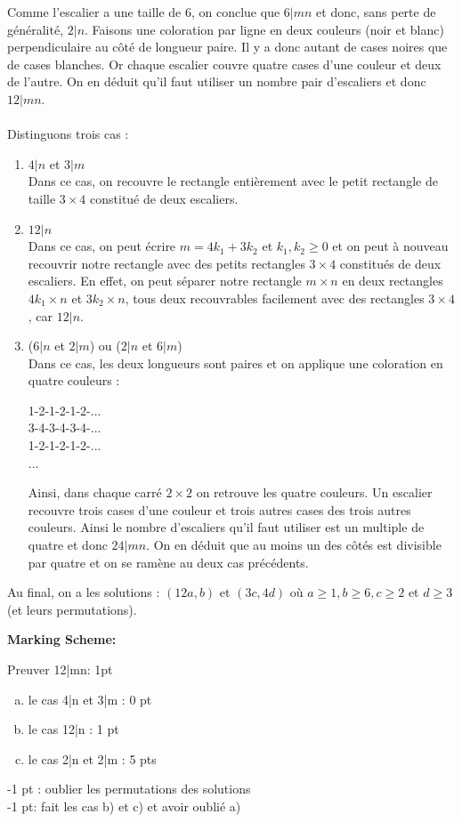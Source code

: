 \documentclass[language=german,style=solution]{smo}
\begin{document}
\begin{enumerate}
Comme l'escalier a une taille de $6$, on conclue que $6|mn$ et donc, sans perte de généralité, $2|n$. Faisons une coloration par ligne en deux couleurs (noir et blanc) perpendiculaire au côté de longueur paire. Il y a donc autant de cases noires que de cases blanches. Or chaque escalier couvre quatre cases d'une couleur et deux de l'autre. On en déduit qu'il faut utiliser un nombre pair d'escaliers et donc $12|mn$.\\
\\Distinguons trois cas :
\begin{enumerate}
\item $4|n$ et $3|m$\\
Dans ce cas, on recouvre le rectangle entièrement avec le petit rectangle de taille $3\times 4$ constitué de deux escaliers.
\item $12|n$\\
Dans ce cas, on peut écrire $m=4k_1 +3k_2$ et $k_1,k_2\geq 0$ et on peut à nouveau recouvrir notre rectangle avec des petits rectangles $3\times 4$ constitués de deux escaliers. En effet, on peut séparer notre rectangle $m\times n$ en deux rectangles $4k_1\times n$ et $3k_2\times n$, tous deux recouvrables facilement avec des rectangles $3\times 4$, car $12|n$.
\item ($6|n$ et $2|m$) ou ($2|n$ et $6|m$)\\
Dans ce cas, les deux longueurs sont paires et on applique une coloration en quatre couleurs :
\begin{center}
1-2-1-2-1-2-...\\
3-4-3-4-3-4-...\\
1-2-1-2-1-2-...\\
...
\end{center}
Ainsi, dans chaque carré $2\times 2$ on retrouve les quatre couleurs. Un escalier recouvre trois cases d'une couleur et trois autres cases des trois autres couleurs. Ainsi le nombre d'escaliers qu'il faut utiliser est un multiple de quatre et donc $24|mn$. On en déduit que au moins un des côtés est divisible par quatre et on se ramène au deux cas précédents.
\end{enumerate}
Au final, on a les solutions : $(12a,b)$ et $(3c,4d)$ où $a\geq 1, b\geq 6, c\geq 2$ et $d\geq 3$ (et leurs permutations). 

\textbf{Marking Scheme:}

Preuver 12|mn: 1pt
\begin{enumerate}[a)]
\item le cas 4|n et 3|m : 0 pt
\item le cas 12|n : 1 pt
\item le cas 2|n et 2|m : 5 pts
\end{enumerate}

-1 pt : oublier les permutations des solutions\\
-1 pt: fait les cas b) et c) et avoir oublié a)

\end{enumerate}
\end{document}

